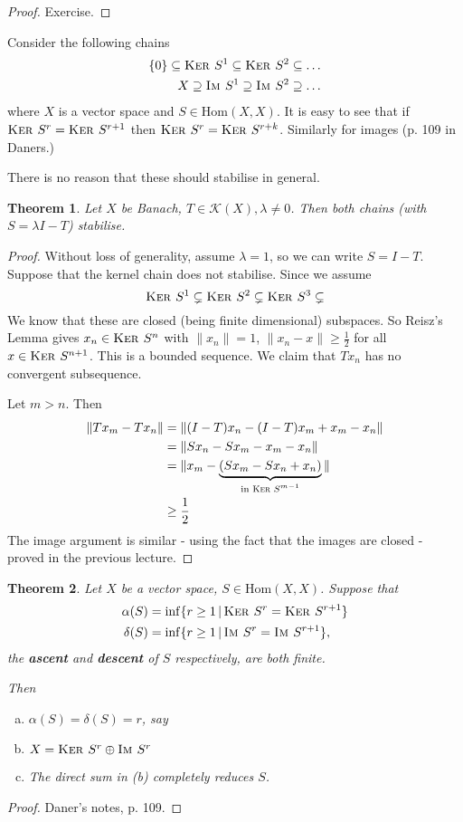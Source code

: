 \documentclass[10pt, reqno, oneside]{amsart}
\theoremstyle{plain}%
\newtheorem{thm}{Theorem}[section]
\theoremstyle{definition}
\theoremstyle{remark}
\newcommand{\given}{ \, | \,}
\newcommand{\im}{\textsc{Im\ }}
\renewcommand{\ker}{\textsc{Ker\ }}
\begin{document}
\begin{proof}
	Exercise.
\end{proof}

Consider the following chains \begin{align*}
	\{ 0 \} \subseteq \ker S^1 \subseteq \ker S^2 \subseteq \dots \\
	X \supseteq \im S^1 \supseteq \im S^2 \supseteq \dots
\end{align*} where $X$ is a vector space and $S \in \text{Hom}(X, X)$.  It is easy to see that if $\ker S^r = \ker S^{r+1}$ then $\ker S^r = \ker S^{r+k}$.  Similarly for images (p. 109 in Daners.)

There is no reason that these should stabilise in general.
\begin{thm}
	Let $X$ be Banach, $T \in \mathcal K(X), \lambda \neq 0$.  Then both chains (with $S = \lambda I - T$) stabilise.  
\end{thm}
\begin{proof}
	 Without loss of generality, assume $\lambda = 1$, so we can write $S = I - T$.  Suppose that the kernel chain does not stabilise.  Since we assume \[
	 	\ker S^1 \subsetneq \ker S^2 \subsetneq \ker S^3 \subsetneq
	 \]  We know that these are closed (being finite dimensional) subspaces.  So Reisz's Lemma gives $x_n \in \ker S^n$ with $\| x_n \| = 1$, $\|x_n - x \| \geq \frac{1}{2}$ for all $x \in \ker S^{n+1}$. This is a bounded sequence.  We claim that $T x_n$ has no convergent subsequence.  
	
	Let $m > n$.  Then \begin{align*}
		\| Tx_m - Tx_n \| 	&= \| ( I - T) x_n - (I-T) x_m + x_m - x_n \| \\
							&= \| Sx_n - Sx_m - x_m - x_n \|\\
							&= \| x_m - \underbrace{(S x_m  - S x_n  + x_n)}_\text{in $\ker S^{m-1}$} \| \\
							&\geq \frac{1}{2}
	\end{align*}  The image argument is similar - using the fact that the images are closed - proved in the previous lecture.
\end{proof}

\begin{thm}
	Let $X$ be a vector space, $S \in \text{Hom}(X, X)$.  Suppose that \begin{align*}
		\alpha(S) &= \inf \{ r \geq 1 \given \ker S^r = \ker S^{r+1} \} \\
		\delta(S) &= \inf \{ r \geq 1 \given \im S^r = \im S^{r+1} \},
	\end{align*} the \textbf{ascent} and \textbf{descent} of $S$ respectively, are both finite.  
	
	Then \begin{enumerate}[(a)]
		\item $\alpha(S) = \delta(S) = r$, say
		\item $X = \ker S^r \oplus \im S^r$
		\item The direct sum in (b) completely reduces $S$. 
	\end{enumerate} 
\end{thm}
\begin{proof}
	Daner's notes, p. 109.
\end{proof}
\end{document}
